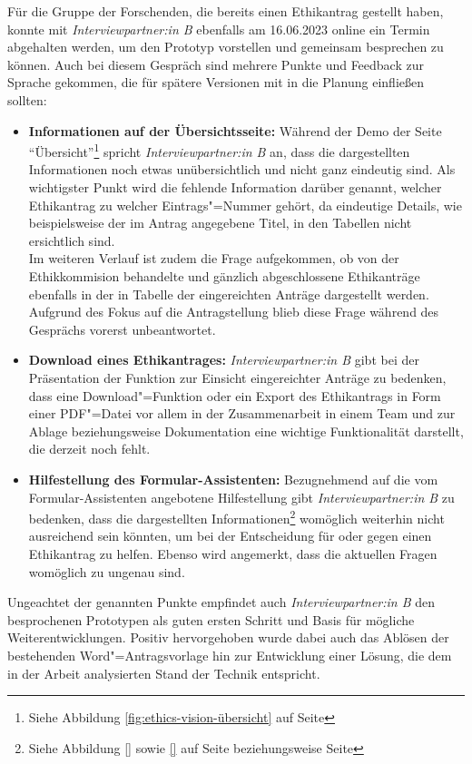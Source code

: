 \documentclass[a4paper,12pt,twoside]{scrreprt}
\begin{document}
Für die Gruppe der Forschenden, die bereits einen Ethikantrag gestellt haben, konnte mit \textit{Interviewpartner:in B} ebenfalls am 16.06.2023 online ein Termin abgehalten werden, um den Prototyp vorstellen und gemeinsam besprechen zu können. Auch bei diesem Gespräch sind mehrere Punkte und Feedback zur Sprache gekommen, die für spätere Versionen mit in die Planung einfließen sollten:
\begin{itemize}
    \item \textbf{Informationen auf der Übersichtsseite:} Während der Demo der Seite \enquote{Übersicht}\footnote{Siehe Abbildung \ref{fig:ethics-vision-übersicht} auf Seite \pageref{fig:ethics-vision-übersicht}} spricht \textit{Interviewpartner:in B} an, dass die dargestellten Informationen noch etwas unübersichtlich und nicht ganz eindeutig sind. Als wichtigster Punkt wird die fehlende Information darüber genannt, welcher Ethikantrag zu welcher Eintrags"=Nummer gehört, da eindeutige Details, wie beispielsweise der im Antrag angegebene Titel, in den Tabellen nicht ersichtlich sind.\\
    Im weiteren Verlauf ist zudem die Frage aufgekommen, ob von der Ethikkommision behandelte und gänzlich abgeschlossene Ethikanträge ebenfalls in der in Tabelle der eingereichten Anträge dargestellt werden. Aufgrund des Fokus auf die Antragstellung blieb diese Frage während des Gesprächs vorerst unbeantwortet.
    \item \textbf{Download eines Ethikantrages:} \textit{Interviewpartner:in B} gibt bei der Präsentation der Funktion zur Einsicht eingereichter Anträge zu bedenken, dass eine Download"=Funktion oder ein Export des Ethikantrags in Form einer PDF"=Datei vor allem in der Zusammenarbeit in einem Team und zur Ablage beziehungsweise Dokumentation eine wichtige Funktionalität darstellt, die derzeit noch fehlt. 
    \item \textbf{Hilfestellung des Formular-Assistenten:} Bezugnehmend auf die vom Formular-Assistenten angebotene Hilfestellung gibt \textit{Interviewpartner:in B} zu bedenken, dass die dargestellten Informationen\footnote{Siehe Abbildung \ref{} sowie \ref{} auf Seite \pageref{} beziehungsweise Seite \pageref{}} womöglich weiterhin nicht ausreichend sein könnten, um bei der Entscheidung für oder gegen einen Ethikantrag zu helfen. Ebenso wird angemerkt, dass die aktuellen Fragen womöglich zu ungenau sind.
\end{itemize}

Ungeachtet der genannten Punkte empfindet auch \textit{Interviewpartner:in B} den besprochenen Prototypen als guten ersten Schritt und Basis für mögliche Weiterentwicklungen. Positiv hervorgehoben wurde dabei auch das Ablösen der bestehenden Word"=Antragsvorlage hin zur Entwicklung einer Lösung, die dem in der Arbeit analysierten Stand der Technik entspricht.
\end{document}
